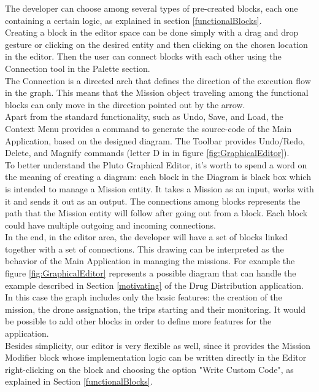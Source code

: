 The developer can choose among several types of pre-created blocks, each one containing a certain logic, as explained in section \ref{functionalBlocks}. 
\\
Creating a block in the editor space can be done simply with a drag and drop gesture or clicking on the desired entity and then clicking on the chosen location in the editor. Then the user can connect blocks with each other using the Connection tool in the Palette section.
\\
The Connection is a directed arch that defines the direction of the execution flow in the graph. This means that the Mission object traveling among the functional blocks can only move in the direction pointed out by the arrow.
\\
 
Apart from the standard functionality, such as Undo, Save, and Load, the Context Menu provides a command to generate the source-code of the Main Application, based on the designed diagram. The Toolbar provides Undo/Redo, Delete, and Magnify commands (letter D in in figure \ref{fig:GraphicalEditor}).
\\

To better understand the Pluto Graphical Editor, it's worth to spend a word on the meaning of creating a diagram: each block in the Diagram is black box which is intended to manage a Mission entity. It takes a Mission as an input, works with it and sends it out as an output. The connections among blocks represents the path that the Mission entity will follow after going out from a block. Each block could have multiple outgoing and incoming connections.
\\

In the end, in the editor area, the developer will have a set of blocks linked together with a set of connections. This drawing can be interpreted as the behavior of the Main Application in managing the missions.
For example the figure \ref{fig:GraphicalEditor} represents a possible diagram that can handle the example described in Section \ref{motivating} of the Drug Distribution application.
\\
In this case the graph includes only the basic features: the creation of the mission, the drone assignation, the trips starting and their monitoring. It would be possible to add other blocks in order to define more features for the application.
\\

Besides simplicity, our editor is very flexible as well, since it provides the Mission Modifier block whose implementation logic can be written directly in the Editor right-clicking on the block and choosing the option "Write Custom Code", as explained in Section \ref{functionalBlocks}.


